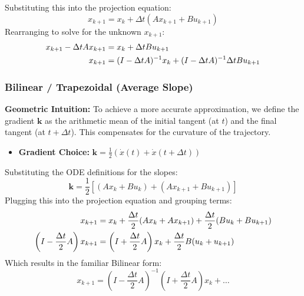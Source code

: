 \documentclass[a4paper,11pt]{article}
\begin{document}
Substituting this into the projection equation:
\begin{equation}
    x_{k+1} = x_k + \Delta t (A x_{k+1} + B u_{k+1})
\end{equation}
Rearranging to solve for the unknown $x_{k+1}$:
\begin{align}
    x_{k+1} - \Delta t A x_{k+1} &= x_k + \Delta t B u_{k+1} \notag \\
    x_{k+1} &= (I - \Delta t A)^{-1} x_k + (I - \Delta t A)^{-1} \Delta t B u_{k+1} \label{eq:be_geom}
\end{align}

\subsubsection{Bilinear / Trapezoidal (Average Slope)}
\textbf{Geometric Intuition:} To achieve a more accurate approximation, we define the gradient $\mathbf{k}$ as the arithmetic mean of the initial tangent (at $t$) and the final tangent (at $t+\Delta t$). This compensates for the curvature of the trajectory.

\begin{itemize}
    \item \textbf{Gradient Choice:} $\mathbf{k} = \frac{1}{2} \left( \dot{x}(t) + \dot{x}(t+\Delta t) \right)$
\end{itemize}

Substituting the ODE definitions for the slopes:
\begin{equation}
    \mathbf{k} = \frac{1}{2} \left[ (A x_k + B u_k) + (A x_{k+1} + B u_{k+1}) \right]
\end{equation}
Plugging this into the projection equation and grouping terms:
\begin{align}
    x_{k+1} &= x_k + \frac{\Delta t}{2} (A x_k + A x_{k+1}) + \frac{\Delta t}{2} (B u_k + B u_{k+1}) \notag \\
    \left(I - \frac{\Delta t}{2} A \right) x_{k+1} &= \left(I + \frac{\Delta t}{2} A \right) x_k + \frac{\Delta t}{2} B (u_k + u_{k+1})
\end{align}
Which results in the familiar Bilinear form:
\begin{equation} \label{eq:bilinear_geom}
    x_{k+1} = \left( I - \frac{\Delta t}{2} A \right)^{-1} \left( I + \frac{\Delta t}{2} A \right) x_k + \dots
\end{equation}
\end{document}
